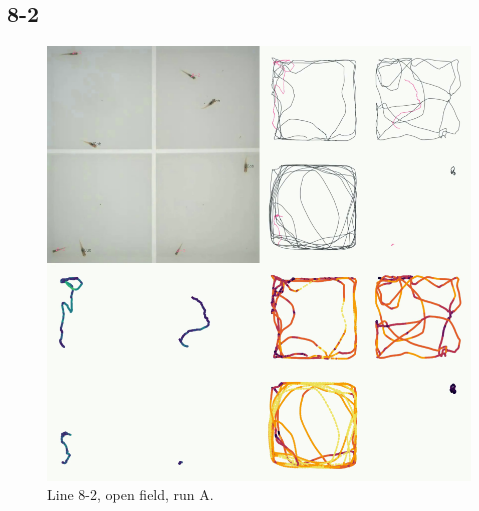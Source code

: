 \documentclass[
]{book}
\begin{document}
\hypertarget{section}{%
\subsection{8-2}\label{section}}



\begin{figure}
\includegraphics[width=1\linewidth]{figs/mikk_behaviour/four_panel_plots/open_field_20191114_1040_8-2_L_A_300} \caption{Line 8-2, open field, run A.}\label{fig:4p-8-2-of-A}
\end{figure}
\end{document}
